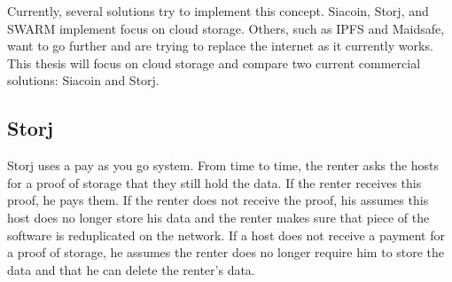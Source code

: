 Currently, several solutions try to implement this concept. Siacoin, Storj, and SWARM implement focus on cloud storage. Others, such as IPFS and Maidsafe, want to go further and are trying to replace the internet as it currently works. This thesis will focus on cloud storage and compare two current commercial solutions: Siacoin and Storj.


\subsection{Storj}

\iffalse
# storj

- storj: uses a pay as you go system. every now and then you ask your storage providers for a proof that they are still holding your data. if you receive this proof, you pay them. If you do not receive a proof, you can assume this data is lost and make sure that piece of your date is reduplicated on the network. if a storage provider does not get paid for his proof, he can assume the user does not longer require him to store the data allowing him to delete this shard. 

- There are still some issues though: 
  - hosts take a risk when storing data, as they are never sure they will be paid. in the most extreme case, a malicious host might store a lot of data on the network, but never pay the first proof of storage, wasting this storage space. This effectively executes a denial of service attack on the network.
  - hosts do have no cost of not providing a proof of storage. 
  this makes the network very vulnerable to a sybil attack \ref{sybil-attack}. in which one malicious agent pretends to be several hosts at same time, at no cost. renters might think their data is secure, as it is duplicated over several hosts. However, the one malicious agent can turn off all his hosts, effectively destroying the stored data.


\fi


Storj uses a pay as you go system. From time to time, the renter asks the hosts for a proof of storage that they still hold the data. If the renter receives this proof, he pays them. If the renter does not receive the proof, his assumes this host does no longer store his data and the renter makes sure that piece of the software is reduplicated on the network. If a host does not receive a payment for a proof of storage, he assumes the renter does no longer require him to store the data and that he can delete the renter's data. \cite{storj}

